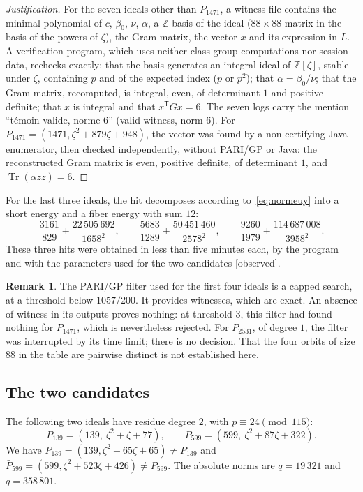 \documentclass[11pt,a4paper]{amsart}
\theoremstyle{plain}
\theoremstyle{definition}
\newtheorem{remark}[theorem]{Remark}
\numberwithin{equation}{section}
\newcommand{\Z}{\mathbb{Z}}
\DeclareMathOperator{\Tr}{Tr}
\newcommand{\st}[1]{\textup{\textsf{\small[#1]}}}
\newcommand{\CONS}{\st{observed}}
\begin{document}
\begin{proof}[Justification]
For the seven ideals other than $P_{1471}$, a witness file contains the minimal polynomial of $c$, $\beta_0$, $\nu$, $\alpha$, a $\Z$-basis of the ideal ($88\times88$ matrix in the basis of the powers of $\zeta$), the Gram matrix, the vector $x$ and its expression in $L$. A verification program, which uses neither class group computations nor session data, rechecks exactly: that the basis generates an integral ideal of $\Z[\zeta]$, stable under $\zeta$, containing $p$ and of the expected index ($p$ or $p^2$); that $\alpha=\beta_0/\nu$; that the Gram matrix, recomputed, is integral, even, of determinant $1$ and positive definite; that $x$ is integral and that $x^{\mathsf T}Gx=6$. The seven logs carry the mention ``t\'emoin valide, norme $6$'' (valid witness, norm $6$). For $P_{1471}=(1471,\zeta^2+879\zeta+948)$, the vector was found by a non-certifying Java enumerator, then checked independently, without PARI/GP or Java: the reconstructed Gram matrix is even, positive definite, of determinant $1$, and $\Tr(\alpha z\bar z)=6$.
\end{proof}

For the last three ideals, the hit decomposes according to~\eqref{eq:normeuy} into a short energy and a fiber energy with sum $12$:
\[
\frac{3161}{829}+\frac{22\,505\,692}{1658^2},\qquad \frac{5683}{1289}+\frac{50\,451\,460}{2578^2},\qquad \frac{9260}{1979}+\frac{114\,687\,008}{3958^2}.
\]
These three hits were obtained in less than five minutes each, by the program and with the parameters used for the two candidates \CONS.

\begin{remark}
The PARI/GP filter used for the first four ideals is a capped search, at a threshold below $1057/200$. It provides witnesses, which are exact. An absence of witness in its outputs proves nothing: at threshold $3$, this filter had found nothing for $P_{1471}$, which is nevertheless rejected. For $P_{2531}$, of degree $1$, the filter was interrupted by its time limit; there is no decision. That the four orbits of size $88$ in the table are pairwise distinct is not established here.
\end{remark}

\subsection{The two candidates}\label{subsec:candidats}

The following two ideals have residue degree $2$, with $p\equiv24\pmod{115}$:
\[
P_{139}=(139,\ \zeta^2+\zeta+77),\qquad P_{599}=(599,\ \zeta^2+87\zeta+322).
\]
We have $\bar P_{139}=(139,\zeta^2+65\zeta+65)\ne P_{139}$ and $\bar P_{599}=(599,\zeta^2+523\zeta+426)\ne P_{599}$. The absolute norms are $q=19\,321$ and $q=358\,801$.
\end{document}

